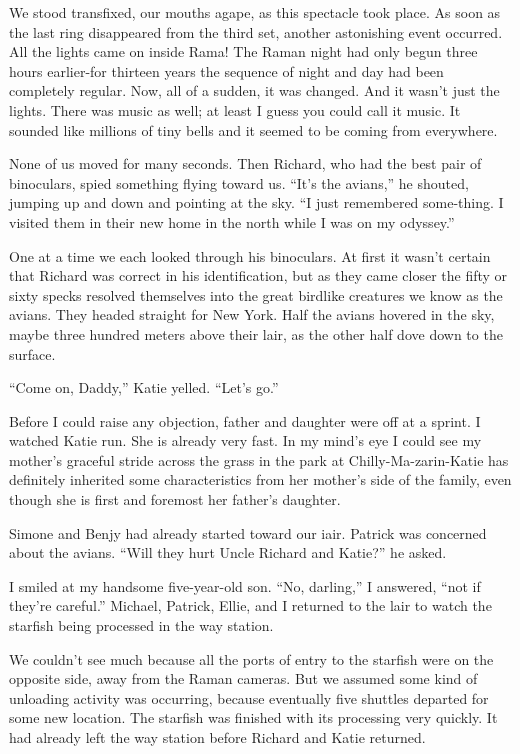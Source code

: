 \documentclass[]{article}
\begin{document}
{We stood transfixed, our mouths agape, as this spectacle took place. As soon as the last ring disappeared from the third set, another astonishing event occurred. All the lights came on inside Rama! The Raman night had only begun three hours earlier-for thirteen years the sequence of night and day had been completely regular. Now, all of a sudden, it was changed. And it wasn’t just the lights. There was music as well; at least I guess you could call it music. It sounded like millions of tiny bells and it seemed to be coming from everywhere.

None of us moved for many seconds. Then Richard, who had the best pair of binoculars, spied something flying toward us. “It’s the avians,” he shouted, jumping up and down and pointing at the sky. “I just remembered some-thing. I visited them in their new home in the north while I was on my odyssey.”

One at a time we each looked through his binoculars. At first it wasn’t certain that Richard was correct in his identification, but as they came closer the fifty or sixty specks resolved themselves into the great birdlike creatures we know as the avians. They headed straight for New York. Half the avians hovered in the sky, maybe three hundred meters above their lair, as the other half dove down to the surface.

“Come on, Daddy,” Katie yelled. “Let’s go.”

Before I could raise any objection, father and daughter were off at a sprint. I watched Katie run. She is already very fast. In my mind’s eye I could see my mother’s graceful stride across the grass in the park at Chilly-Ma-zarin-Katie has definitely inherited some characteristics from her mother’s side of the family, even though she is first and foremost her father’s daughter.

Simone and Benjy had already started toward our iair. Patrick was concerned about the avians. “Will they hurt Uncle Richard and Katie?” he asked.

I smiled at my handsome five-year-old son. “No, darling,” I answered, “not if they’re careful.” Michael, Patrick, Ellie, and I returned to the lair to watch the starfish being processed in the way station.

We couldn’t see much because all the ports of entry to the starfish were on the opposite side, away from the Raman cameras. But we assumed some kind of unloading activity was occurring, because eventually five shuttles departed for some new location. The starfish was finished with its processing very quickly. It had already left the way station before Richard and Katie returned.

}
\end{document}
